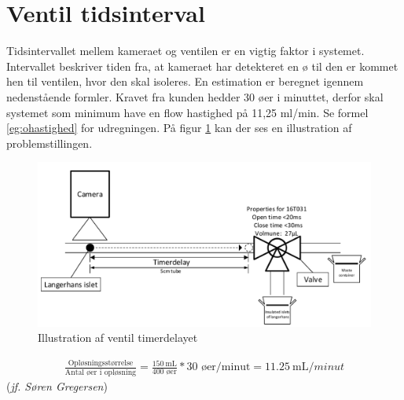
\newpage
 \section{Ventil tidsinterval}
Tidsintervallet mellem kameraet og ventilen er en vigtig faktor i systemet. Intervallet beskriver tiden fra, at kameraet har detekteret en ø til den er kommet hen til ventilen, hvor den skal isoleres. En estimation er beregnet igennem nedenstående formler. Kravet fra kunden hedder 30 øer i minuttet, derfor skal systemet som minimum have en flow hastighed på 11,25 ml/min. Se formel \ref{eg:ohastighed} for udregningen. På figur \ref{fig:tidsintervalventil} kan der ses en illustration af problemstillingen.

\begin{figure}[H]
	\centering
	\includegraphics[width=1\textwidth]{billeder/Hovedrapport/tidsinterval.pdf}
	\caption{Illustration af ventil timerdelayet}
	\label{fig:tidsintervalventil}
\end{figure}

\begin{align}
\frac{\text{Opløsningsstørrelse}}{\text{Antal øer i opløsning}} = \frac{\SI{150}{\milli\liter}}{400\text{ øer}}*30\text{ øer/minut} = \SI{11,25}{\milli\liter/minut} 
\label{eg:ohastighed}
\end{align}(\textit{jf. Søren Gregersen})


